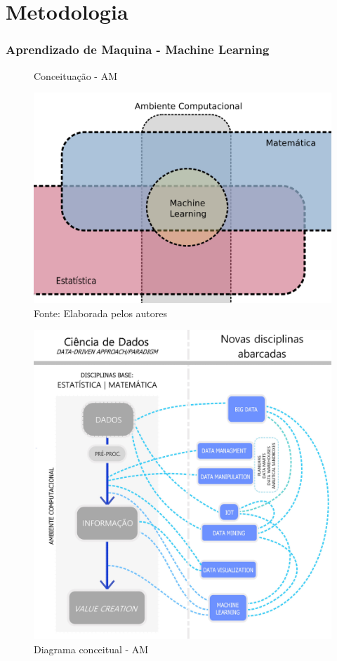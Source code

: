 \documentclass[11pt, aspectratio=169]{beamer}
\begin{document}
\section{Metodologia}

\begin{frame}
\frametitle{Aprendizado de Maquina - Machine Learning}
\begin{figure}[ht]
  \begin{minipage}[b]{0.45\linewidth}
          \centering
    \caption{Conceituação - AM}
    \includegraphics[height=.6\paperheight]{../Figures/ML/mat_est_ML.png}
    \\{\footnotesize Fonte: Elaborada pelos autores}
    \label{fig:diag_ml_01}
  \end{minipage}
  \hspace{0.2cm}
  \begin{minipage}[b]{0.45\linewidth}
    \centering
    \caption{Diagrama conceitual - AM}
    \includegraphics[height=.6\paperheight]{../Figures/ML/MAPA_conceitual_ciencia_de_dados_recorte.jpg}

\end{minipage}
\end{figure}
\end{frame}
\end{document}
